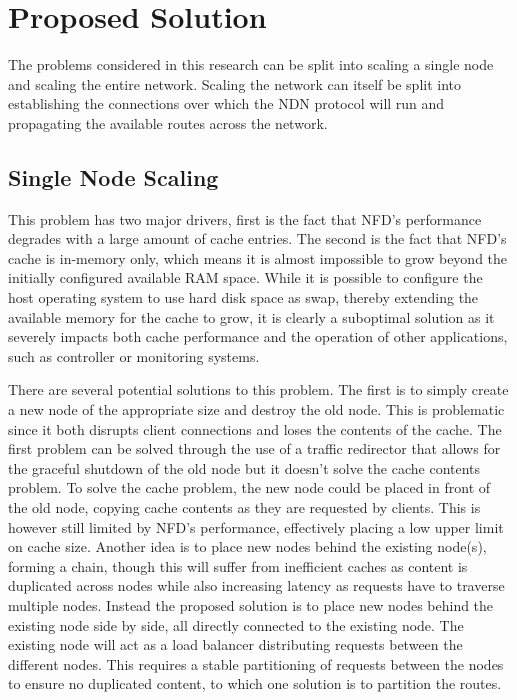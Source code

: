 \documentclass[letterpaper,12pt]{article}
\begin{document}
\section*{Proposed Solution}

The problems considered in this research can be split into scaling a single node and scaling the entire network. Scaling the network can itself be split into establishing the connections over which the NDN protocol will run and propagating the available routes across the network.


\subsection*{Single Node Scaling}
This problem has two major drivers, first is the fact that NFD's performance degrades with a large amount of cache entries. The second is the fact that NFD's cache is in-memory only, which means it is almost impossible to grow beyond the initially configured available RAM space. While it is possible to configure the host operating system to use hard disk space as swap, thereby extending the available memory for the cache to grow, it is clearly a suboptimal solution as it severely impacts both cache performance and the operation of other applications, such as controller or monitoring systems.

There are several potential solutions to this problem. The first is to simply create a new node of the appropriate size and destroy the old  node. This is problematic since it both disrupts client connections and loses the contents of the cache. The first problem can be solved through the use of a traffic redirector that allows for the graceful shutdown of the old node but it doesn't solve the cache contents problem. To solve the cache problem, the new node could be placed in front of the old node, copying cache contents as they are requested by clients. This is however still limited by NFD's performance, effectively placing a low upper limit on cache size. Another idea is to place new nodes behind the existing node(s), forming a chain, though this will suffer from inefficient caches as content is duplicated across nodes while also increasing latency as requests have to traverse multiple nodes. Instead the proposed solution is to place new nodes behind the existing node side by side, all directly connected to the existing node. The existing node will act as a load balancer distributing requests between the different nodes. This requires a stable partitioning of requests between the nodes to ensure no duplicated content, to which one solution is to partition the routes.
\end{document}
